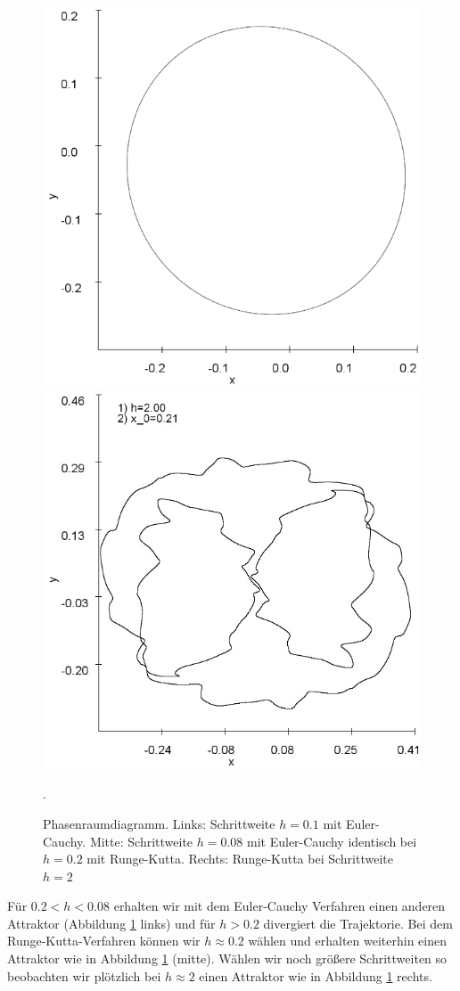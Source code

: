 \documentclass[12pt,a4paper]{article}
\begin{document}
\begin{figure}[!htbp]
\includegraphics[scale=0.28]{duffing-awp1-500k-nach-500k-h0,08-euler}
\includegraphics[scale=0.28]{duffing-awp1-h2-runge-kutta}
\caption{Phasenraumdiagramm. Links: Schrittweite $h=0.1$ mit Euler-Cauchy. Mitte: Schrittweite $h=0.08$ mit Euler-Cauchy identisch bei $h=0.2$ mit Runge-Kutta. Rechts: Runge-Kutta bei Schrittweite $h=2$}. 
\label{fig:duffing-awp1}
\end{figure}
Für $0.2<h<0.08$ erhalten wir mit dem Euler-Cauchy Verfahren einen anderen Attraktor (Abbildung \ref{fig:duffing-awp1} links) und für $h>0.2$ divergiert die Trajektorie. Bei dem Runge-Kutta-Verfahren können wir $h \approx 0.2$ wählen und erhalten weiterhin einen Attraktor wie in Abbildung \ref{fig:duffing-awp1} (mitte). Wählen wir noch größere Schrittweiten so beobachten wir plötzlich bei $h \approx 2$ einen Attraktor wie in Abbildung \ref{fig:duffing-awp1} rechts.
\end{document}
